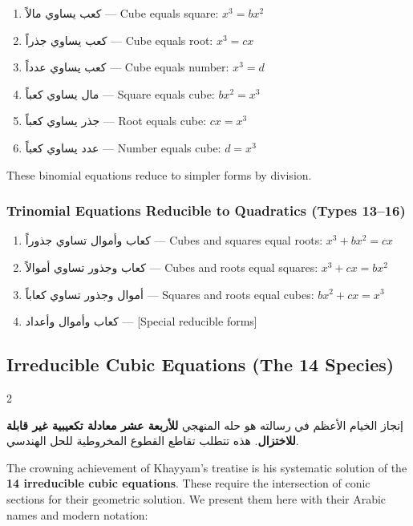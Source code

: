 \documentclass[11pt,a4paper]{book}
\begin{document}
\begin{enumerate}[label=\arabic*.,resume,noitemsep]
\item \textarabic{كعب يساوي مالاً} --- Cube equals square: $x^3 = b x^2$
\item \textarabic{كعب يساوي جذراً} --- Cube equals root: $x^3 = c x$
\item \textarabic{كعب يساوي عدداً} --- Cube equals number: $x^3 = d$
\item \textarabic{مال يساوي كعباً} --- Square equals cube: $b x^2 = x^3$
\item \textarabic{جذر يساوي كعباً} --- Root equals cube: $c x = x^3$
\item \textarabic{عدد يساوي كعباً} --- Number equals cube: $d = x^3$
\end{enumerate}

These binomial equations reduce to simpler forms by division.

\subsubsection{Trinomial Equations Reducible to Quadratics (Types 13--16)}
\label{subsubsec:trinomial-red}

\begin{enumerate}[label=\arabic*.,resume,noitemsep]
\item \textarabic{كعاب وأموال تساوي جذوراً} --- Cubes and squares equal roots: $x^3 + b x^2 = c x$
\item \textarabic{كعاب وجذور تساوي أموالاً} --- Cubes and roots equal squares: $x^3 + c x = b x^2$
\item \textarabic{أموال وجذور تساوي كعاباً} --- Squares and roots equal cubes: $b x^2 + c x = x^3$
\item \textarabic{كعاب وأموال وأعداد} --- [Special reducible forms]
\end{enumerate}

\subsection{Irreducible Cubic Equations (The 14 Species)}
\label{subsec:irreducible}

\begin{paracol}{2}

\begin{Arabic}
إنجاز الخيام الأعظم في رسالته هو حله المنهجي \textbf{للأربعة عشر معادلة تكعيبية غير قابلة للاختزال}. هذه تتطلب تقاطع القطوع المخروطية للحل الهندسي.
\end{Arabic}

\switchcolumn

The crowning achievement of Khayyam's treatise is his systematic solution of the \textbf{14 irreducible cubic equations}. These require the intersection of conic sections for their geometric solution. We present them here with their Arabic names and modern notation:

\end{paracol}
\end{document}
